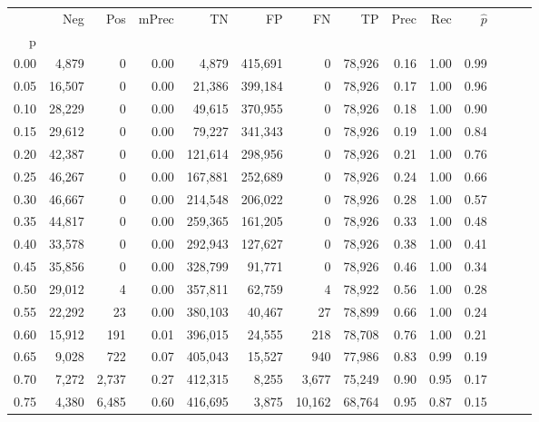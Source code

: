 \begin{tabular}{rrrrrrrrrrrrrr}
\toprule
{} &     Neg &     Pos & mPrec &       TN &       FP &      FN &      TP &  Prec &   Rec & $\hat{p}$ \\
p    &         &         &       &          &          &         &         &       &       &           \\
\midrule
0.00 &   4,879 &       0 &  0.00 &    4,879 &  415,691 &       0 &  78,926 &  0.16 &  1.00 &      0.99 \\
0.05 &  16,507 &       0 &  0.00 &   21,386 &  399,184 &       0 &  78,926 &  0.17 &  1.00 &      0.96 \\
0.10 &  28,229 &       0 &  0.00 &   49,615 &  370,955 &       0 &  78,926 &  0.18 &  1.00 &      0.90 \\
0.15 &  29,612 &       0 &  0.00 &   79,227 &  341,343 &       0 &  78,926 &  0.19 &  1.00 &      0.84 \\
0.20 &  42,387 &       0 &  0.00 &  121,614 &  298,956 &       0 &  78,926 &  0.21 &  1.00 &      0.76 \\
0.25 &  46,267 &       0 &  0.00 &  167,881 &  252,689 &       0 &  78,926 &  0.24 &  1.00 &      0.66 \\
0.30 &  46,667 &       0 &  0.00 &  214,548 &  206,022 &       0 &  78,926 &  0.28 &  1.00 &      0.57 \\
0.35 &  44,817 &       0 &  0.00 &  259,365 &  161,205 &       0 &  78,926 &  0.33 &  1.00 &      0.48 \\
0.40 &  33,578 &       0 &  0.00 &  292,943 &  127,627 &       0 &  78,926 &  0.38 &  1.00 &      0.41 \\
0.45 &  35,856 &       0 &  0.00 &  328,799 &   91,771 &       0 &  78,926 &  0.46 &  1.00 &      0.34 \\
0.50 &  29,012 &       4 &  0.00 &  357,811 &   62,759 &       4 &  78,922 &  0.56 &  1.00 &      0.28 \\
0.55 &  22,292 &      23 &  0.00 &  380,103 &   40,467 &      27 &  78,899 &  0.66 &  1.00 &      0.24 \\
0.60 &  15,912 &     191 &  0.01 &  396,015 &   24,555 &     218 &  78,708 &  0.76 &  1.00 &      0.21 \\
0.65 &   9,028 &     722 &  0.07 &  405,043 &   15,527 &     940 &  77,986 &  0.83 &  0.99 &      0.19 \\
0.70 &   7,272 &   2,737 &  0.27 &  412,315 &    8,255 &   3,677 &  75,249 &  0.90 &  0.95 &      0.17 \\
0.75 &   4,380 &   6,485 &  0.60 &  416,695 &    3,875 &  10,162 &  68,764 &  0.95 &  0.87 &      0.15 \\

\end{tabular}
